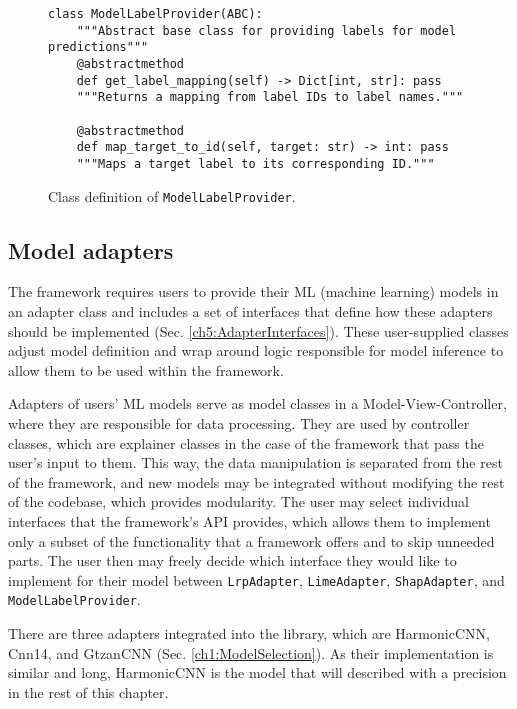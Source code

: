 \documentclass[
    bindingoffset=5mm,  %
    footnoteindent=3mm, %
    hyphenation=true    %
]{src/wut-thesis}
\begin{document}
\begin{figure}%
\begin{verbatim}
class ModelLabelProvider(ABC):
    """Abstract base class for providing labels for model predictions"""
    @abstractmethod
    def get_label_mapping(self) -> Dict[int, str]: pass
    """Returns a mapping from label IDs to label names."""

    @abstractmethod
    def map_target_to_id(self, target: str) -> int: pass
    """Maps a target label to its corresponding ID."""
\end{verbatim}
\caption{Class definition of \texttt{ModelLabelProvider}.}
\label{fig:ModelLabelProvider}
\end{figure}

\subsection{Model adapters} \label{ch5:ModelAdapters}

The framework requires users to provide their ML (machine learning) models
in an adapter class and includes a set of interfaces that define how these
adapters should be implemented (Sec. \ref{ch5:AdapterInterfaces}). These user-supplied classes adjust
model definition and wrap around logic responsible for model inference to allow
them to be used within the framework.

Adapters of users’ ML models serve as model classes in a Model-View-Controller,
where they are responsible for data processing. They are used by controller classes,
which are explainer classes in the case of the framework that pass the user’s input to them.
This way, the data manipulation is separated from the rest of the framework,
and new models may be integrated without modifying the rest of the codebase, which provides modularity.
The user may select individual interfaces that the framework’s API provides,
which allows them to implement only a subset of the functionality that a framework
offers and to skip unneeded parts. The user then may freely decide which interface
they would like to implement for their model between 
\texttt{LrpAdapter}, \texttt{LimeAdapter}, \texttt{ShapAdapter}, and \texttt{ModelLabelProvider}.

There are three adapters integrated into the library, which are HarmonicCNN, Cnn14, and GtzanCNN
(Sec. \ref{ch1:ModelSelection}). As their implementation is similar and long, HarmonicCNN is the model
that will described with a precision in the rest of this chapter.
\end{document}
